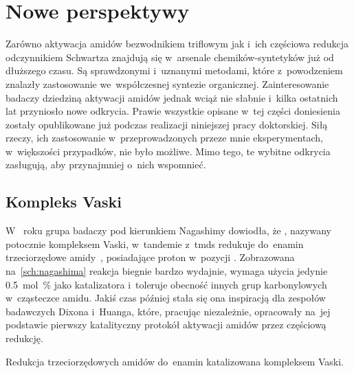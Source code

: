
\section{Nowe perspektywy}\label{literature:new}
Zarówno aktywacja amidów bezwodnikiem triflowym jak i~ich częściowa redukcja odczynnikiem
  Schwartza znajdują się w~arsenale chemików-syntetyków już od dłuższego czasu.
Są sprawdzonymi i~uznanymi metodami, które z~powodzeniem znalazły zastosowanie
  we~współczesnej syntezie organicznej.
Zainteresowanie badaczy dziedziną aktywacji amidów jednak wciąż nie słabnie i~kilka
  ostatnich lat przyniosło nowe odkrycia.
Prawie wszystkie opisane w~tej części doniesienia zostały opublikowane już podczas
  realizacji niniejszej pracy doktorskiej.
Siłą rzeczy, ich zastosowanie w~przeprowadzonych przeze mnie eksperymentach, w~większości
  przypadków, nie było możliwe.
Mimo tego, te wybitne odkrycia zasługują, aby przynajmniej o~nich wspomnieć.

\subsection{Kompleks Vaski}\label{literature:new:vasca}
W~\citeyear{motoyama09} roku grupa badaczy pod kierunkiem Nagashimy dowiodła, że \vaska{}, nazywany
  potocznie kompleksem Vaski, w~tandemie z~\gls{tmds} redukuje do~enamin 
  trzeciorzędowe amidy~, posiadające proton w~pozycji
  \textalpha{}.
Zobrazowana na~\cref{sch:nagashima} reakcja biegnie bardzo wydajnie, wymaga użycia jedynie
  \SI{0.5}{\mole\percent} \vaska{} jako katalizatora i~toleruje obecność innych grup
  karbonylowych w~cząsteczce amidu.
Jakiś czas później stała się ona inspiracją dla zespołów badawczych Dixona i~Huanga, które,
  pracując niezależnie, opracowały na~jej podstawie pierwszy katalityczny protokół aktywacji
  amidów przez częściową redukcję.
\begin{marginscheme}
  
  \caption{Redukcja trzeciorzędowych amidów do~enamin katalizowana kompleksem Vaski.}
  \label{sch:nagashima}
\end{marginscheme}

